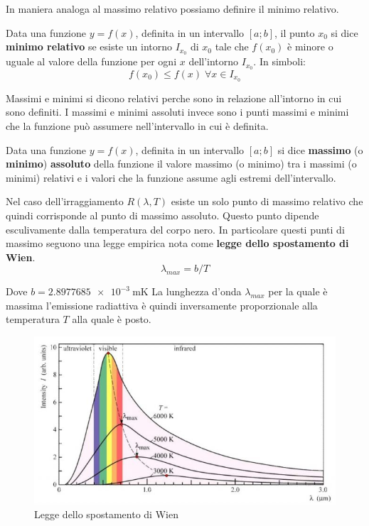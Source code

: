 \documentclass[12pt,twoside]{report}
\begin{document}
In maniera analoga al massimo relativo possiamo definire il minimo relativo.

\begin{definition}
Data una funzione $y = f(x)$, definita in un intervallo $[a;b]$, il punto $x_0$ si dice \textbf{minimo relativo} se esiste un intorno $I_{x_0}$ di $x_0$ tale che $f(x_0)$ è minore o uguale al valore della funzione per ogni $x$ dell'intorno $I_{x_0}$. In simboli:
$$ f(x_0) \leq f(x) \; \forall x \in I_{x_0} $$
\end{definition}
\par{Massimi e minimi si dicono relativi perche sono in relazione all'intorno in cui sono definiti. I massimi e minimi assoluti invece sono i punti massimi e minimi che la funzione può assumere nell'intervallo in cui è definita.}

\begin{definition}
Data una funzione $y = f(x)$, definita in un intervallo $[a;b]$ si dice \textbf{massimo} (o \textbf{minimo}) \textbf{assoluto} della funzione il valore massimo (o minimo) tra i massimi (o minimi) relativi e i valori che la funzione assume agli estremi dell'intervallo.
\end{definition}
\par{Nel caso dell'irraggiamento $R(\lambda,T)$ esiste un solo punto di massimo relativo che quindi corrisponde al punto di massimo assoluto. Questo punto dipende esculivamente dalla temperatura del corpo nero. In particolare questi punti di massimo seguono una legge empirica nota come \textbf{legge dello spostamento di Wien}. }
$$ \lambda _{max} = b/T $$
\par{Dove $b = \SI{2.8977685e-3}{\meter\kelvin} $ \newline La lunghezza d'onda $\lambda _{max}$ per la quale è massima l'emissione radiattiva è quindi inversamente proporzionale alla temperatura $T$ alla quale è posto.}

\begin{figure}[!h]
\centering
\includegraphics[width = 0.5\hsize]{./figures/leggeWien}
\caption{Legge dello spostamento di Wien}
\label{fig:logo}
\end{figure}
\end{document}
